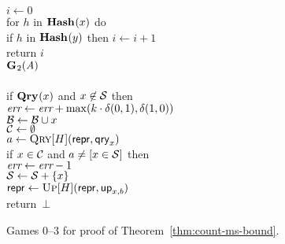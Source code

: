 \begin{figure*}
{      $i \gets 0$\\
      for $h$ in $\textup{\textbf{Hash}}\hspace{0.5pt}(x)$ do\\
      \tab if $h$ in $\textup{\textbf{Hash}}\hspace{0.5pt}(y)$ then $i \gets i+1$\\
      return $i$
    \\[6pt]
    \underline{$\textup{\textbf{G}}\hspace{0.5pt}_2(\mathit{A})$}\\[2pt]
    \\
      if $\textup{\textbf{Qry}}\hspace{0.5pt}(x)$ and $x \not\in \mathcal{S}$ then\\
      \tab $\textit{err} \gets \textit{err} + \max(k \cdot \delta(0,1), \delta(1,0))$\\
      $\mathcal{B} \gets \mathcal{B} \cup x$\\
      $\mathcal{C} \gets \emptyset$\\
      $a \gets \textnormal{\textsc{Qry}}[H](\mathsf{repr}, \mathsf{qry}_x)$\\
      if $x \in \mathcal{C}$ and $a \neq [x \in \mathcal{S}]$ then\\
      \tab $\textit{err} \gets \textit{err}-1$\\
      $\mathcal{S} \gets \mathcal{S} + \{x\}$\\
      $\mathsf{repr} \gets \textnormal{\textsc{Up}}[H](\mathsf{repr},\mathsf{up}_{x,b})$\\
      return~$\bot$
  }
  {
  }
  {
  }
  \caption{Games 0--3 for proof of Theorem~\ref{thm:count-ms-bound}.}
  \label{fig:count-ms-bound}
\end{figure*}


